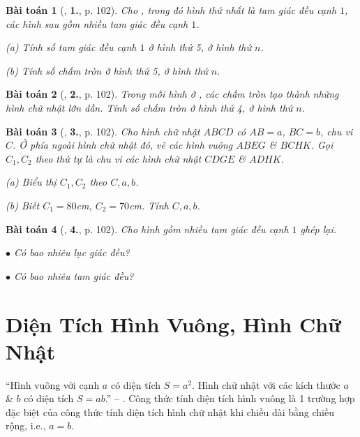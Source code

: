 \documentclass{article}
\numberwithin{equation}{section}
\newtheorem{baitoan}{Bài toán}[section]
\begin{document}
\begin{baitoan}[\cite{Binh_Toan_6_tap_1}, \textbf{1.}, p. 102]
	Cho \cite[Hình 20, p. 101]{Binh_Toan_6_tap_1}, trong đó hình thứ nhất là tam giác đều cạnh $1$, các hình sau gồm nhiều tam giác đều cạnh $1$.
	\begin{enumerate*}
		\item[(a)] Tính số tam giác đều cạnh $1$ ở hình thứ 5, ở hình thứ $n$.
		\item[(b)] Tính số chấm tròn ở hình thứ 5, ở hình thứ $n$.
	\end{enumerate*}
\end{baitoan}

\begin{baitoan}[\cite{Binh_Toan_6_tap_1}, \textbf{2.}, p. 102]
	Trong mỗi hình ở \cite[Hình 21, p. 101]{Binh_Toan_6_tap_1}, các chấm tròn tạo thành những hình chữ nhật lớn dần. Tính số chấm tròn ở hình thứ 4, ở hình thứ $n$.
\end{baitoan}

\begin{baitoan}[\cite{Binh_Toan_6_tap_1}, \textbf{3.}, p. 102]
	Cho hình chữ nhật $ABCD$ có $AB = a$, $BC = b$, chu vi $C$. Ở phía ngoài hình chữ nhật đó, vẽ các hình vuông $ABEG$ \& $BCHK$. Gọi $C_1,C_2$ theo thứ tự là chu vi các hình chữ nhật $CDGE$ \& $ADHK$.
	\begin{enumerate*}
		\item[(a)] Biểu thị $C_1,C_2$ theo $C,a,b$.
		\item[(b)] Biết $C_1 = 80$\emph{cm}, $C_2 = 70$\emph{cm}. Tính $C,a,b$.
	\end{enumerate*}
\end{baitoan}

\begin{baitoan}[\cite{Binh_Toan_6_tap_1}, \textbf{4.}, p. 102]
	Cho hình \cite[Hình 22, p. 101]{Binh_Toan_6_tap_1} gồm nhiều tam giác đều cạnh $1$ ghép lại.
	\begin{enumerate*}
		\item[$\bullet$] Có bao nhiêu lục giác đều?
		\item[$\bullet$] Có bao nhiêu tam giác đều?
	\end{enumerate*}
\end{baitoan}


\section{Diện Tích Hình Vuông, Hình Chữ Nhật}
``Hình vuông với cạnh $a$ có diện tích $S = a^2$. Hình chữ nhật với các kích thước $a$ \& $b$ có diện tích $S = ab$.'' -- \cite[p. 102]{Binh_Toan_6_tap_1}. Công thức tính diện tích hình vuông là 1 trường hợp đặc biệt của công thức tính diện tích hình chữ nhật khi chiều dài bằng chiều rộng, i.e., $a = b$.
\end{document}
